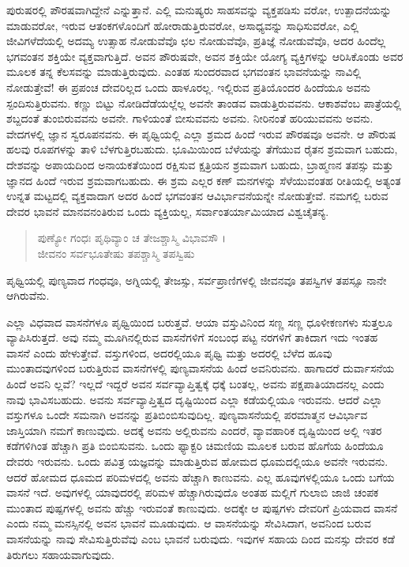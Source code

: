 ಪುರುಷರಲ್ಲಿ ಪೌರಷವಾಗಿದ್ದೇನೆ ಎನ್ನುತ್ತಾನೆ. ಎಲ್ಲಿ ಮನುಷ್ಯರು ಸಾಹಸವನ್ನು ವ್ಯಕ್ತಪಡಿಸು ವರೋ, ಉತ್ಪಾದನೆಯನ್ನು ಮಾಡುವರೋ, ಇರುವ ಆತಂಕಗಳೊಂದಿಗೆ ಹೋರಾಡುತ್ತಿರುವರೋ, ಅಸಾಧ್ಯವನ್ನು ಸಾಧಿಸುವರೋ, ಎಲ್ಲಿ ಜೀವಿಗಳೆದೆಯಲ್ಲಿ ಅದಮ್ಯ ಉತ್ಸಾಹ ನೋಡುವೆವೊ ಛಲ ನೋಡುವೆವೊ, ಪ್ರತಿಜ್ಞೆ ನೋಡುವೆವೊ, ಅದರ ಹಿಂದೆಲ್ಲ ಭಗವಂತನ ಶಕ್ತಿಯೇ ವ್ಯಕ್ತವಾಗುತ್ತಿದೆ. ಅವನ ಪೌರುಷವೇ, ಅವನ ಶಕ್ತಿಯೇ ಯೋಗ್ಯ ವ್ಯಕ್ತಿಗಳನ್ನು ಆರಿಸಿಕೊಂಡು ಅವರ ಮೂಲಕ ತನ್ನ ಕೆಲಸವನ್ನು ಮಾಡುತ್ತಿರುವುದು. ಎಂತಹ ಸುಂದರವಾದ ಭಗವಂತನ ಭಾವನೆಯನ್ನು ನಾವಿಲ್ಲಿ ನೋಡುತ್ತೇವೆ! ಈ ಪ್ರಪಂಚ ದೇವರಿಲ್ಲದ ಒಂದು ಹಾಳೂರಲ್ಲ. ಇಲ್ಲಿರುವ ಪ್ರತಿಯೊಂದರ ಹಿಂದೆಯೂ ಅವನು ಸ್ಪಂದಿಸುತ್ತಿರುವನು. ಕಣ್ಣು ಬಿಟ್ಟು ನೋಡಿದೆಡೆಯಲ್ಲೆಲ್ಲ ಅವನೇ ತಾಂಡವ ವಾಡುತ್ತಿರುವವನು. ಆಕಾಶವೆಂಬ ಪಾತ್ರೆಯಲ್ಲಿ ಶಬ್ದದಂತೆ ತುಂಬಿರುವವನು ಅವನೇ. ಗಾಳಿಯಂತೆ ಬೀಸುವವನು ಅವನು. ನೀರಿನಂತೆ ಹರಿಯುವವನು ಅವನು. ವೇದಗಳಲ್ಲಿ ಜ್ಞಾನ ಸ್ವರೂಪನವನು. ಈ ಪೃಥ್ವಿಯಲ್ಲಿ ಎಲ್ಲಾ ಶ್ರಮದ ಹಿಂದೆ ಇರುವ ಪೌರಷವೂ ಅವನೇ. ಆ ಪೌರುಷ ಹಲವು ರೂಪಗಳನ್ನು ತಾಳಿ ಬೆಳಗುತ್ತಿರಬಹುದು. ಭೂಮಿಯಿಂದ ಬೆಳೆಯನ್ನು ತೆಗೆಯುವ ರೈತನ ಶ್ರಮವಾಗ ಬಹುದು, ದೇಶವನ್ನು ಅಪಾಯದಿಂದ ಅನಾಯಕತೆಯಿಂದ ರಕ್ಷಿಸುವ ಕ್ಷತ್ರಿಯನ ಶ್ರಮವಾಗ ಬಹುದು, ಬ್ರಾಹ್ಮಣನ ತಪಸ್ಸು ಮತ್ತು ಜ್ಞಾನದ ಹಿಂದೆ ಇರುವ ಶ್ರಮವಾಗಬಹುದು. ಈ ಶ್ರಮ ಎಲ್ಲರ ಕಣ್ ಮನಗಳನ್ನು ಸೆಳೆಯುವಂತಹ ರೀತಿಯಲ್ಲಿ ಅತ್ಯಂತ ಉನ್ನತ ಮಟ್ಟದಲ್ಲಿ ವ್ಯಕ್ತವಾದಾಗ ಅದರ ಹಿಂದೆ ಭಗವಂತನ ಆವಿರ್ಭಾವನೆಯನ್ನೇ ನೋಡುತ್ತೇವೆ. ನಮಗಲ್ಲಿ ಬರುವ ದೇವರ ಭಾವನೆ ಮಾನವನಂತಿರುವ ಒಂದು ವ್ಯಕ್ತಿಯಲ್ಲ, ಸರ್ವಾಂತರ್ಯಾಮಿಯಾದ ವಿಶ್ವಚೈತನ್ಯ.

\begin{verse}
ಪುಣ್ಯೋ ಗಂಧಃ ಪೃಥಿವ್ಯಾಂ ಚ ತೇಜಶ್ಚಾಸ್ಮಿ ವಿಭಾವಸೌ ।\\ಜೀವನಂ ಸರ್ವಭೂತೇಷು ತಪಶ್ಚಾಸ್ಮಿ ತಪಸ್ವಿಷು 
\end{verse}

{\small ಪೃಥ್ವಿಯಲ್ಲಿ ಪುಣ್ಯವಾದ ಗಂಧವೂ, ಅಗ್ನಿಯಲ್ಲಿ ತೇಜಸ್ಸು, ಸರ್ವಪ್ರಾಣಿಗಳಲ್ಲಿ ಜೀವನವೂ ತಪಸ್ವಿಗಳ ತಪಸ್ಸೂ ನಾನೇ ಆಗಿರುವೆನು. }

ಎಲ್ಲಾ ವಿಧವಾದ ವಾಸನೆಗಳೂ ಪೃಥ್ವಿಯಿಂದ ಬರುತ್ತವೆ. ಆಯಾ ವಸ್ತುವಿನಿಂದ ಸಣ್ಣ ಸಣ್ಣ ಧೂಳೀಕಣಗಳು ಸುತ್ತಲೂ ವ್ಯಾಪಿಸಿರುತ್ತದೆ. ಅವು ನಮ್ಮ ಮೂಗಿನಲ್ಲಿರುವ ವಾಸನೆಗಳಿಗೆ ಸಂಬಂಧ ಪಟ್ಟ ನರಗಳಿಗೆ ತಾಕಿದಾಗ ಇದು ಇಂತಹ ವಾಸನೆ ಎಂದು ಹೇಳುತ್ತೇವೆ. ವಸ್ತುಗಳಿಂದ, ಅದರಲ್ಲಿಯೂ ಪೃಥ್ವಿ ಮತ್ತು ಅದರಲ್ಲಿ ಬೆಳೆದ ಹೂವು ಮುಂತಾದವುಗಳಿಂದ ಬರುತ್ತಿರುವ ವಾಸನೆಗಳಲ್ಲಿ ಪುಣ್ಯವಾಸನೆಯ ಹಿಂದೆ ಅವನಿರುವನು. ಹಾಗಾದರೆ ದುರ್ವಾಸನೆಯ ಹಿಂದೆ ಅವನಿ ಲ್ಲವೆ? ಇಲ್ಲದೆ ಇದ್ದರೆ ಅವನ ಸರ್ವವ್ಯಾಪ್ತಿತ್ವಕ್ಕೆ ಧಕ್ಕೆ ಬಂತಲ್ಲ, ಅವನು ಪಕ್ಷಪಾತಿಯಾದನಲ್ಲ ಎಂದು ನಾವು ಭಾವಿಸಬಹುದು. ಅವನು ಸರ್ವವ್ಯಾಪ್ತಿತ್ವದ ದೃಷ್ಟಿಯಿಂದ ಎಲ್ಲಾ ಕಡೆಯಲ್ಲಿಯೂ ಇರುವನು. ಆದರೆ ಎಲ್ಲಾ ವಸ್ತುಗಳೂ ಒಂದೇ ಸಮನಾಗಿ ಅವನನ್ನು ಪ್ರತಿಬಿಂಬಿಸುವುದಿಲ್ಲ. ಪುಣ್ಯವಾಸನೆಯಲ್ಲಿ ಪರಮಾತ್ಮನ ಆವಿರ್ಭಾವ ಜಾಸ್ತಿಯಾಗಿ ನಮಗೆ ಕಾಣುವುದು. ಅದಕ್ಕೆ ಅವನು ಅಲ್ಲಿರುವನು ಎಂದರೆ, ವ್ಯಾವಹಾರಿಕ ದೃಷ್ಟಿಯಿಂದ ಅಲ್ಲಿ ಇತರ ಕಡೆಗಳಿಗಿಂತ ಹೆಚ್ಚಾಗಿ ಪ್ರತಿ ಬಿಂಬಿಸುವನು. ಒಂದು ಫ್ಯಾಕ್ಟರಿ ಚಿಮಣಿಯ ಮೂಲಕ ಬರುವ ಹೊಗೆಯ ಹಿಂದೆಯೂ ದೇವರು ಇರುವನು. ಒಂದು ಪವಿತ್ರ ಯಜ್ಞವನ್ನು ಮಾಡುತ್ತಿರುವ ಹೋಮದ ಧೂಮದಲ್ಲಿಯೂ ಅವನೇ ಇರುವನು. ಆದರೆ ಹೋಮದ ಧೂಮದ ಪರಿಮಳದಲ್ಲಿ ಅವನು ಹೆಚ್ಚಾಗಿ ಕಾಣುವನು. ಎಲ್ಲ ಹೂವುಗಳಲ್ಲಿಯೂ ಒಂದು ಬಗೆಯ ವಾಸನೆ ಇದೆ. ಅವುಗಳಲ್ಲಿ ಯಾವುದರಲ್ಲಿ ಪರಿಮಳ ಹೆಚ್ಚಾಗಿರುವುದೊ ಅಂತಹ ಮಲ್ಲಿಗೆ ಗುಲಾಬಿ ಜಾಜಿ ಚಂಪಕ ಮುಂತಾದ ಪುಷ್ಪಗಳಲ್ಲಿ ಅವನು ಹೆಚ್ಚು ಇರುವಂತೆ ಕಾಣುವುದು. ಅದಕ್ಕೇ ಆ ಪುಷ್ಪಗಳು ದೇವರಿಗೆ ಪ್ರಿಯವಾದ ವಾಸನೆ ಎಂದು ನಮ್ಮ ಮನಸ್ಸಿನಲ್ಲಿ ಅವನ ಭಾವನೆ ಮೂಡುವುದು. ಆ ವಾಸನೆಯನ್ನು ಸೇವಿಸಿದಾಗ, ಅವನಿಂದ ಬರುವ ವಾಸನೆಯನ್ನು ನಾವು ಸೇವಿಸುತ್ತಿರುವೆವು ಎಂಬ ಭಾವನೆ ಬರುವುದು. ಇವುಗಳ ಸಹಾಯ ದಿಂದ ಮನಸ್ಸು ದೇವರ ಕಡೆ ತಿರುಗಲು ಸಹಾಯವಾಗುವುದು.

